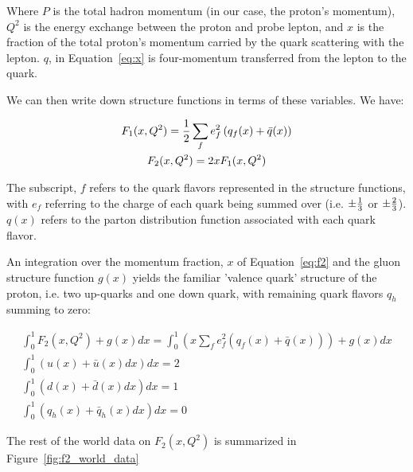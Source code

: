 Where $P$  is the total hadron momentum (in our case, the proton's momentum),
$Q^2$ is the energy exchange between the proton and probe lepton, and $x$ is the
fraction of the total proton's momentum carried by the quark scattering with the
lepton. $q$, in Equation~\ref{eq:x} is four-momentum transferred from the lepton
to the quark. 

We can then write down structure functions in terms of these variables. We have:

\begin{gather}
  F_1(x,Q^2) = {1 \over 2}\sum_f e_f^2 \left(q_f(x)+\bar{q}(x)\right)
  \label{eq:f1} \\
  F_2(x,Q^2) = 2xF_1(x,Q^2)\label{eq:f2}
\end{gather}

The subscript, $f$ refers to the quark flavors represented in the structure
functions, with $e_f$ referring to the charge of each quark being summed over
(i.e. ${\pm}{1\over3}$ or ${\pm}{2\over3}$). $q(x)$ refers to the parton
distribution function associated with each quark flavor. 

An integration over the momentum fraction, $x$ of Equation~\ref{eq:f2} and the
gluon structure function $g(x)$ yields the familiar 'valence quark' structure of
the proton, i.e. two up-quarks and one down quark, with remaining quark flavors
$q_h$ summing to zero:

\begin{gather}
	\int_0^1 F_2(x,Q^2) + g(x) dx 
	= \int_0^1 
	\left(
		x\sum_f e_f^2 \left(q_f(x)+\bar{q}(x)\right) 
	\right) 
	+ g(x) dx \label{eq:f2_int_1} \\
	\int_0^1 \left(u(x)+\bar{u}(x) dx \right) dx = 2  \label{eq:up_quark_valence} \\
	\int_0^1 \left(d(x)+\bar{d}(x) dx \right) dx = 1  \label{eq:down_quark_valence} \\
	\int_0^1 \left(q_h(x)+\bar{q}_h(x) dx \right) dx = 0 \label{eq:other_quark_valence}
\end{gather}

The rest of the world data on $F_2(x,Q^2)$ is summarized in
Figure~\ref{fig:f2_world_data}

